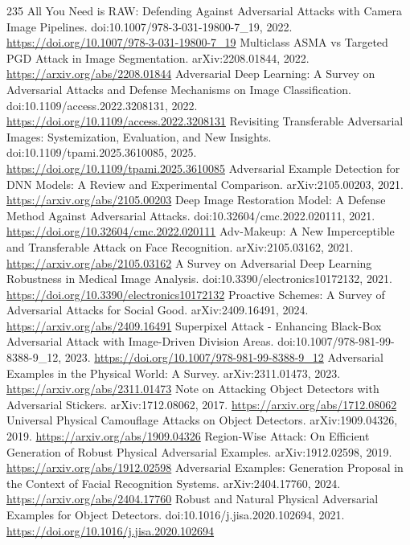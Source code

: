 \documentclass[11pt]{article}
\begin{document}
\begin{thebibliography}{235}
 All You Need is RAW: Defending Against Adversarial Attacks with Camera Image Pipelines. doi:10.1007/978-3-031-19800-7\_19, 2022. \url{https://doi.org/10.1007/978-3-031-19800-7_19}
 Multiclass ASMA vs Targeted PGD Attack in Image Segmentation. arXiv:2208.01844, 2022. \url{https://arxiv.org/abs/2208.01844}
 Adversarial Deep Learning: A Survey on Adversarial Attacks and Defense Mechanisms on Image Classification. doi:10.1109/access.2022.3208131, 2022. \url{https://doi.org/10.1109/access.2022.3208131}
 Revisiting Transferable Adversarial Images: Systemization, Evaluation, and New Insights. doi:10.1109/tpami.2025.3610085, 2025. \url{https://doi.org/10.1109/tpami.2025.3610085}
 Adversarial Example Detection for DNN Models: A Review and Experimental Comparison. arXiv:2105.00203, 2021. \url{https://arxiv.org/abs/2105.00203}
 Deep Image Restoration Model: A Defense Method Against Adversarial Attacks. doi:10.32604/cmc.2022.020111, 2021. \url{https://doi.org/10.32604/cmc.2022.020111}
 Adv-Makeup: A New Imperceptible and Transferable Attack on Face Recognition. arXiv:2105.03162, 2021. \url{https://arxiv.org/abs/2105.03162}
 A Survey on Adversarial Deep Learning Robustness in Medical Image Analysis. doi:10.3390/electronics10172132, 2021. \url{https://doi.org/10.3390/electronics10172132}
 Proactive Schemes: A Survey of Adversarial Attacks for Social Good. arXiv:2409.16491, 2024. \url{https://arxiv.org/abs/2409.16491}
 Superpixel Attack - Enhancing Black-Box Adversarial Attack with Image-Driven Division Areas. doi:10.1007/978-981-99-8388-9\_12, 2023. \url{https://doi.org/10.1007/978-981-99-8388-9_12}
 Adversarial Examples in the Physical World: A Survey. arXiv:2311.01473, 2023. \url{https://arxiv.org/abs/2311.01473}
 Note on Attacking Object Detectors with Adversarial Stickers. arXiv:1712.08062, 2017. \url{https://arxiv.org/abs/1712.08062}
 Universal Physical Camouflage Attacks on Object Detectors. arXiv:1909.04326, 2019. \url{https://arxiv.org/abs/1909.04326}
 Region-Wise Attack: On Efficient Generation of Robust Physical Adversarial Examples. arXiv:1912.02598, 2019. \url{https://arxiv.org/abs/1912.02598}
 Adversarial Examples: Generation Proposal in the Context of Facial Recognition Systems. arXiv:2404.17760, 2024. \url{https://arxiv.org/abs/2404.17760}
 Robust and Natural Physical Adversarial Examples for Object Detectors. doi:10.1016/j.jisa.2020.102694, 2021. \url{https://doi.org/10.1016/j.jisa.2020.102694}

\end{thebibliography}
\end{document}
